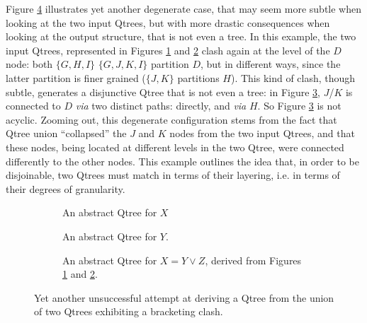 Figure \ref{fig2:qtree-x-y-z-disj-degenerate2} illustrates yet another degenerate case, that may seem more subtle when looking at the two input Qtrees, but with more drastic consequences when looking at the output structure, that is not even a tree. In this example, the two input Qtrees, represented in Figures \ref{fig2:qtree-y''} and \ref{fig2:qtree-z''} clash again at the level of the $D$ node: both $\lbrace G, H, I \rbrace$ $\lbrace G, J, K, I \rbrace$ partition $D$, but in different ways, since the latter partition is finer grained ($\lbrace J, K\rbrace$ partitions $H$). This kind of clash, though subtle, generates a disjunctive Qtree that is not even a tree: in Figure \ref{fig2:qtree-xy-disj-degenerate2}, $J$/$K$ is connected to $D$ \textit{via} two distinct paths: directly, and \textit{via} $H$. So Figure \ref{fig2:qtree-xy-disj-degenerate2} is not acyclic. Zooming out, this degenerate configuration stems from the fact that Qtree union ``collapsed'' the $J$ and $K$ nodes from the two input Qtrees, and that these nodes, being located at different levels in the two Qtree, were connected differently to the other nodes. This example outlines the idea that, in order to be disjoinable, two Qtrees must match in terms of their layering, i.e. in terms of their degrees of granularity.

\begin{figure}[H]
	\centering
	\begin{subfigure}[t]{.3\linewidth}
		\centering
		\caption{An abstract Qtree for $X$}\label{fig2:qtree-y''}
	\end{subfigure}
	\hfill
	\begin{subfigure}[t]{.3\linewidth}
		\centering\scalebox{.7}{
			\begin{forest}
				[A[{B}][\fbox{C}][{D}[G][J][K][I]]]
		\end{forest}}
		\caption{An abstract Qtree for $Y$.}\label{fig2:qtree-z''}
	\end{subfigure}
	\hfill
	\begin{subfigure}[t]{.3\linewidth}
		\centering{}
		\caption{An abstract Qtree for $X = Y \vee Z$, derived from Figures \ref{fig2:qtree-y''} and \ref{fig2:qtree-z''}.}\label{fig2:qtree-xy-disj-degenerate2}
	\end{subfigure}
	\caption{Yet another unsuccessful attempt at deriving a Qtree from the union of two Qtrees exhibiting a bracketing clash.}\label{fig2:qtree-x-y-z-disj-degenerate2}
\end{figure}



